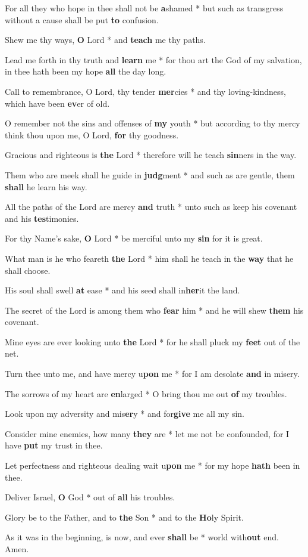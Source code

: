 \begin{multicols}{2}
	For all they who hope in thee shall not be \textbf{a}shamed * but such as transgress without a cause shall be put \textbf{to} confusion.
	
	Shew me thy ways, \textbf{O} Lord * and \textbf{teach} me thy paths.
	
	Lead me forth in thy truth and \textbf{learn} me * for thou art the God of my salvation, in thee hath been my hope \textbf{all} the day long.
	
	Call to remembrance, O Lord, thy tender \textbf{mer}cies * and thy loving-kindness, which have been \textbf{ev}er of old.
	
	O remember not the sins and offenses of \textbf{my} youth * but according to thy mercy think thou upon me, O Lord, \textbf{for} thy goodness.
	
	Gracious and righteous is \textbf{the} Lord * therefore will he teach \textbf{sin}ners in the way.
	
	Them who are meek shall he guide in \textbf{judg}ment * and such as are gentle, them \textbf{shall} he learn his way.
	
	All the paths of the Lord are mercy \textbf{and} truth * unto such as keep his covenant and his \textbf{tes}timonies.
	
	For thy Name's sake, \textbf{O} Lord * be merciful unto my \textbf{sin} for it is great.
	
	What man is he who feareth \textbf{the} Lord * him shall he teach in the \textbf{way} that he shall choose.
	
	His soul shall swell \textbf{at} ease * and his seed shall in\textbf{her}it the land.
	
	The secret of the Lord is among them who \textbf{fear} him * and he will shew \textbf{them} his covenant.
	
	Mine eyes are ever looking unto \textbf{the} Lord * for he shall pluck my \textbf{feet} out of the net.
	
	Turn thee unto me, and have mercy u\textbf{pon} me * for I am desolate \textbf{and} in misery.
	
	The sorrows of my heart are \textbf{en}larged * O bring thou me out \textbf{of} my troubles.
	
	Look upon my adversity and mis\textbf{er}y * and for\textbf{give} me all my sin.
	
	Consider mine enemies, how many \textbf{they} are * let me not be confounded, for I have \textbf{put} my trust in thee.
	
	Let perfectness and righteous dealing wait u\textbf{pon} me * for my hope \textbf{hath} been in thee.
	
	Deliver Israel, \textbf{O} God * out of \textbf{all} his troubles.
	
	Glory be to the Father, and to \textbf{the} Son * and to the \textbf{Ho}ly Spirit.
	
	As it was in the beginning, is now, and ever \textbf{shall} be * world with\textbf{out} end. Amen.
\end{multicols}